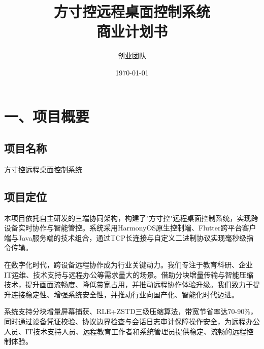 \documentclass[12pt,a4paper]{article}
\title{\textbf{方寸控远程桌面控制系统\\商业计划书}}
\author{创业团队}
\date{\today}
\begin{document}
\sloppy


\maketitle
\thispagestyle{empty}
\newpage

\begingroup
\hypersetup{linkcolor=black}
\tableofcontents
\endgroup
\newpage


\section{一、项目概要}

\subsection{项目名称}
方寸控远程桌面控制系统

\subsection{项目定位}

本项目依托自主研发的三端协同架构，构建了"方寸控"远程桌面控制系统，实现跨设备实时协作与智能管控。系统采用HarmonyOS原生控制端、Flutter跨平台客户端与Java服务端的技术组合，通过TCP长连接与自定义二进制协议实现毫秒级指令传输。

在数字化时代，跨设备远程协作成为行业关键动力。我们专注于教育科研、企业IT运维、技术支持与远程办公等需求量大的场景。借助分块增量传输与智能压缩技术，提升画面流畅度、降低带宽占用，并推动远程协作体验升级。我们致力于提升连接稳定性、增强系统安全性，并推动行业向国产化、智能化时代迈进。

系统支持分块增量屏幕捕获、RLE+ZSTD三级压缩算法，带宽节省率达70-90\%，同时通过设备凭证校验、协议边界检查与会话日志审计保障操作安全，为远程办公人员、IT技术支持人员、远程教育工作者和系统管理员提供稳定、流畅的远程控制体验。
\end{document}
